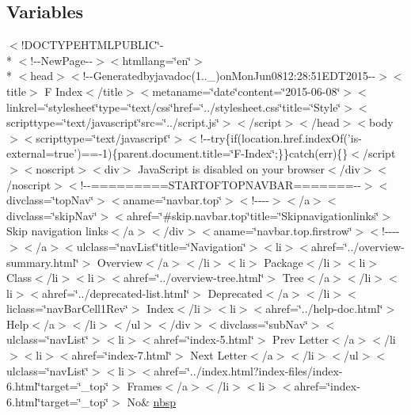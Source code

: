 \subsection*{Variables}
\begin{DoxyCompactItemize}
\item 
$<$!D\-O\-C\-T\-Y\-P\-E\-H\-T\-M\-L\-P\-U\-B\-L\-I\-C\char`\"{}-\/\\*
$<$!-\/-\/New\-Page-\/-\/$>$$<$htmllang=\char`\"{}en\char`\"{}$>$\\*
$<$head$>$$<$!-\/-\/Generatedbyjavadoc(1..\-\_)on\-Mon\-Jun0812\-:28\-:51\-E\-D\-T2015-\/-\/$>$$<$title$>$ F Index$<$/title$>$$<$metaname=\char`\"{}date\char`\"{}content=\char`\"{}2015-\/06-\/08\char`\"{}$>$$<$linkrel=\char`\"{}stylesheet\char`\"{}type=\char`\"{}text/css\char`\"{}href=\char`\"{}../stylesheet.\-css\char`\"{}title=\char`\"{}\-Style\char`\"{}$>$$<$scripttype=\char`\"{}text/javascript\char`\"{}src=\char`\"{}../script.\-js\char`\"{}$>$$<$/script$>$$<$/head$>$$<$body$>$$<$scripttype=\char`\"{}text/javascript\char`\"{}$>$$<$!-\/-\/try\{if(location.\-href.\-index\-Of('is-\/external=true')==-\/1)\{parent.\-document.\-title=\char`\"{}\-F-\/\-Index\char`\"{};\}\}catch(err)\{\}$<$/script$>$$<$noscript$>$$<$div$>$ Java\-Script is disabled on your browser$<$/div$>$$<$/noscript$>$$<$!-\/-\/=========\-S\-T\-A\-R\-T\-O\-F\-T\-O\-P\-N\-A\-V\-B\-A\-R=======-\/-\/$>$$<$divclass=\char`\"{}top\-Nav\char`\"{}$>$$<$aname=\char`\"{}navbar.\-top\char`\"{}$>$$<$!-\/-\/-\/-\/$>$$<$/a$>$$<$divclass=\char`\"{}skip\-Nav\char`\"{}$>$$<$ahref=\char`\"{}\#skip.\-navbar.\-top\char`\"{}title=\char`\"{}\-Skipnavigationlinks\char`\"{}$>$ Skip navigation links$<$/a$>$$<$/div$>$$<$aname=\char`\"{}navbar.\-top.\-firstrow\char`\"{}$>$$<$!-\/-\/-\/-\/$>$$<$/a$>$$<$ulclass=\char`\"{}nav\-List\char`\"{}title=\char`\"{}\-Navigation\char`\"{}$>$$<$li$>$$<$ahref=\char`\"{}../overview-\/summary.\-html\char`\"{}$>$ Overview$<$/a$>$$<$/li$>$$<$li$>$ Package$<$/li$>$$<$li$>$ Class$<$/li$>$$<$li$>$$<$ahref=\char`\"{}../overview-\/tree.\-html\char`\"{}$>$ Tree$<$/a$>$$<$/li$>$$<$li$>$$<$ahref=\char`\"{}../deprecated-\/list.\-html\char`\"{}$>$ Deprecated$<$/a$>$$<$/li$>$$<$liclass=\char`\"{}nav\-Bar\-Cell1\-Rev\char`\"{}$>$ Index$<$/li$>$$<$li$>$$<$ahref=\char`\"{}../help-\/doc.\-html\char`\"{}$>$ Help$<$/a$>$$<$/li$>$$<$/ul$>$$<$/div$>$$<$divclass=\char`\"{}sub\-Nav\char`\"{}$>$$<$ulclass=\char`\"{}nav\-List\char`\"{}$>$$<$li$>$$<$ahref=\char`\"{}index-\/5.\-html\char`\"{}$>$ Prev Letter$<$/a$>$$<$/li$>$$<$li$>$$<$ahref=\char`\"{}index-\/7.\-html\char`\"{}$>$ Next Letter$<$/a$>$$<$/li$>$$<$/ul$>$$<$ulclass=\char`\"{}nav\-List\char`\"{}$>$$<$li$>$$<$ahref=\char`\"{}../index.\-html?index-\/files/index-\/6.\-html\char`\"{}target=\char`\"{}\-\_\-top\char`\"{}$>$ Frames$<$/a$>$$<$/li$>$$<$li$>$$<$ahref=\char`\"{}index-\/6.\-html\char`\"{}target=\char`\"{}\-\_\-top\char`\"{}$>$ No\& \hyperlink{index-6_8html_a479d00f21dbca369efe3be97f1ef785a}{nbsp}

\end{DoxyCompactItemize}
